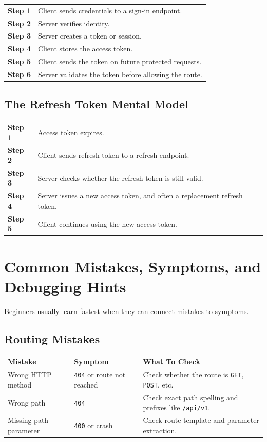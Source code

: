 \documentclass[11pt,a4paper]{article}
\begin{document}
\begin{longtable}{p{} p{}}
\textbf{Step 1} & Client sends credentials to a sign-in endpoint. \\
\textbf{Step 2} & Server verifies identity. \\
\textbf{Step 3} & Server creates a token or session. \\
\textbf{Step 4} & Client stores the access token. \\
\textbf{Step 5} & Client sends the token on future protected requests. \\
\textbf{Step 6} & Server validates the token before allowing the route. \\
\end{longtable}

\subsection{The Refresh Token Mental Model}

\begin{longtable}{p{} p{}}
\textbf{Step 1} & Access token expires. \\
\textbf{Step 2} & Client sends refresh token to a refresh endpoint. \\
\textbf{Step 3} & Server checks whether the refresh token is still valid. \\
\textbf{Step 4} & Server issues a new access token, and often a replacement refresh token. \\
\textbf{Step 5} & Client continues using the new access token. \\
\end{longtable}

\section{Common Mistakes, Symptoms, and Debugging Hints}

Beginners usually learn fastest when they can connect mistakes to symptoms.

\subsection{Routing Mistakes}

\begin{longtable}{p{} p{} p{}}
\textbf{Mistake} & \textbf{Symptom} & \textbf{What To Check} \\
Wrong HTTP method & \texttt{404} or route not reached & Check whether the route is \texttt{GET}, \texttt{POST}, etc. \\
Wrong path & \texttt{404} & Check exact path spelling and prefixes like \texttt{/api/v1}. \\
Missing path parameter & \texttt{400} or crash & Check route template and parameter extraction. \\
\end{longtable}
\end{document}
